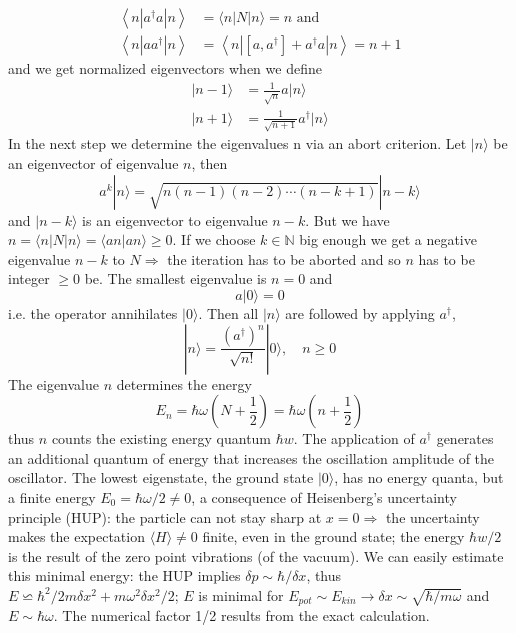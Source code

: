 \begin{equation}
\begin{aligned}\left\langle n\left|a^{\dagger} a\right| n\right\rangle &=\langle n|N| n\rangle= n \text { and } \\\left\langle n\left|a a^{\dagger}\right| n\right\rangle &=\left\langle n\left|\left[a, a^{\dagger}\right]+a^{\dagger} a\right| n\right\rangle= n+1 \end{aligned}
\end{equation}
and we get normalized eigenvectors when we define
\begin{equation}
\begin{aligned}|n-1\rangle &=\frac{1}{\sqrt{n}} a|n\rangle \\|n+1\rangle &=\frac{1}{\sqrt{n+1}} a^{\dagger}|n\rangle \end{aligned}
\end{equation}
In the next step we determine the eigenvalues ​​n via an abort criterion. Let $|n\rangle$ be an eigenvector of eigenvalue $n$, then
\begin{equation}
    a^{k}|n\rangle=\sqrt{n(n-1)(n-2) \cdots(n-k+1)}|n-k\rangle
    \end{equation}
and $|n-k\rangle$ is an eigenvector to eigenvalue $n - k$. But we have $n = \langle n | N | n\rangle = \langle an | an\rangle \geq 0$. If we choose $k \in\mathbb{N}$ big enough we get a negative eigenvalue $n - k$ to $N \Rightarrow$  the iteration has to be aborted and so $n$ has to be integer $\geq 0$ be. The smallest eigenvalue is $n = 0$ and
\begin{equation}
    a|0\rangle= 0
    \end{equation}
i.e. the operator annihilates $|0\rangle$. Then all $|n\rangle$ are followed by applying $a^{\dagger}$,
\begin{equation}
    |n\rangle=\frac{\left(a^{\dagger}\right)^{n}}{\sqrt{n !}}|0\rangle, \quad n \geq 0
    \end{equation}
The eigenvalue $n$ determines the energy
\begin{equation}
    E_{n}=\hbar \omega\left(N+\frac{1}{2}\right)=\hbar \omega\left(n+\frac{1}{2}\right)
    \end{equation}
thus $n$ counts the existing energy quantum $\hbar w$. The application of $a^{\dagger}$ generates an additional quantum of energy that increases the oscillation amplitude of the oscillator. The lowest eigenstate, the ground state $|0\rangle$, has no energy quanta, but a finite energy $E_0 = \hbar ω / 2 \neq 0$, a consequence of Heisenberg's uncertainty principle (HUP): the particle can not stay sharp at $x = 0 \Rightarrow$ the uncertainty makes the expectation $\langle H\rangle \neq 0$ finite, even in the ground state; the energy $\hbar w/2$ is the result of the zero point vibrations (of the vacuum). We can easily estimate this minimal energy: the HUP implies $\delta p\sim \hbar/\delta x$, thus $E \backsimeq \hbar^2/ 2m\delta x^2 + mω^2 \delta x^2 / 2$; $E$ is minimal for $E_{pot}\sim E_{kin}\to\delta x \sim \sqrt{\hbar/ mω}$ and $E \sim \hbar ω.$ The numerical factor 1/2 results from the exact calculation.
